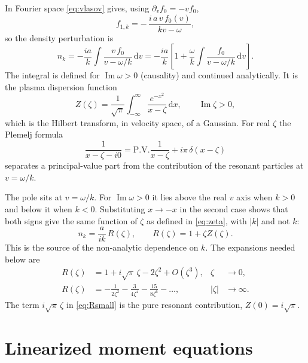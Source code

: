 \documentclass[11pt]{article}
\newcommand{\PV}{\mathrm{P.V.}\!\!}
\newcommand{\dd}{\mathrm{d}}
\begin{document}
In Fourier space \eqref{eq:vlasov} gives, using $\partial_v f_0 = -v f_0$,
\[
  f_{1,k} = -\,\frac{i\,a\,v\,f_0(v)}{k v - \omega},
\]
so the density perturbation is
\[
  n_k = -\frac{i a}{k}\int \frac{v\,f_0}{v - \omega/k}\,\dd v
      = -\frac{i a}{k}\left[1 + \frac{\omega}{k}
        \int \frac{f_0}{v - \omega/k}\,\dd v\right].
\]
The integral is defined for $\operatorname{Im}\omega > 0$ (causality) and
continued analytically. It is the plasma dispersion function
\begin{equation}
  Z(\zeta) = \frac{1}{\sqrt{\pi}}\int_{-\infty}^{\infty}
             \frac{e^{-x^2}}{x - \zeta}\,\dd x ,
  \qquad \operatorname{Im}\zeta > 0,
  \label{eq:Z}
\end{equation}
which is the Hilbert transform, in velocity space, of a Gaussian. For real
$\zeta$ the Plemelj formula
\[
  \frac{1}{x - \zeta - i0} = \PV\frac{1}{x - \zeta} + i\pi\,\delta(x - \zeta)
\]
separates a principal-value part from the contribution of the resonant
particles at $v = \omega/k$.

The pole sits at $v = \omega/k$. For $\operatorname{Im}\omega > 0$ it lies
above the real $v$ axis when $k > 0$ and below it when $k < 0$. Substituting
$x \to -x$ in the second case shows that both signs give the same function of
$\zeta$ as defined in \eqref{eq:zeta}, with $|k|$ and not $k$:
\begin{equation}
  n_k = \frac{a}{ik}\,R(\zeta), \qquad R(\zeta) = 1 + \zeta Z(\zeta).
  \label{eq:R}
\end{equation}
This is the source of the non-analytic dependence on $k$. The expansions
needed below are
\begin{align}
  R(\zeta) &= 1 + i\sqrt{\pi}\,\zeta - 2\zeta^2 + O(\zeta^3),
  & \zeta &\to 0, \label{eq:Rsmall}\\
  R(\zeta) &= -\frac{1}{2\zeta^2} - \frac{3}{4\zeta^4}
              - \frac{15}{8\zeta^6} - \dots,
  & |\zeta| &\to \infty. \label{eq:Rlarge}
\end{align}
The term $i\sqrt{\pi}\,\zeta$ in \eqref{eq:Rsmall} is the pure resonant
contribution, $Z(0) = i\sqrt{\pi}$.

\section{Linearized moment equations}
\end{document}
